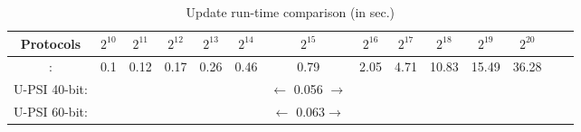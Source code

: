 \begin{table*}[!htbp]
\begin{footnotesize}
\begin{center}
\caption{\small Update run-time comparison (in sec.)}\label{tbl::update} 


\renewcommand{\arraystretch}{1.3}

\begin{tabular}{|c|ccccccccccc|c|c} 
\hline 
\cellcolor{gray!20} \scriptsize \textbf{Protocols} &\cellcolor{gray!20} $2^{\scriptscriptstyle 10}$ &\cellcolor{gray!20}  $2^{\scriptscriptstyle 11}$&  \cellcolor{gray!20}$2^{\scriptscriptstyle 12}$&\cellcolor{gray!20}  $2^{\scriptscriptstyle 13}$&\cellcolor{gray!20} $2^{\scriptscriptstyle 14}$&\cellcolor{gray!20}   $2^{\scriptscriptstyle 15}$&\cellcolor{gray!20}  $2^{\scriptscriptstyle 16}$&\cellcolor{gray!20}   $2^{\scriptscriptstyle 17}$& \cellcolor{gray!20}  $2^{\scriptscriptstyle 18}$& \cellcolor{gray!20} $2^{\scriptscriptstyle 19}$&\cellcolor{gray!20}  $2^{\scriptscriptstyle 20}$ \\
    \hline
    
    \hline



\cellcolor{cyan!20}  \scriptsize \cite{eopsi}:&\cellcolor{cyan!20} 0.1&\cellcolor{cyan!20} 0.12&\cellcolor{cyan!20}  0.17&\cellcolor{cyan!20} 0.26&\cellcolor{cyan!20}  0.46&\cellcolor{cyan!20}  0.79 &\cellcolor{cyan!20}  2.05&\cellcolor{cyan!20}  4.71  &\cellcolor{cyan!20} 10.83 &\cellcolor{cyan!20} 15.49 & \cellcolor{cyan!20} 36.28    \\

\cellcolor{white!20}  \scriptsize U-PSI 40-bit: &\cellcolor{white!20}   &\cellcolor{white!20}   &\cellcolor{white!20} &\cellcolor{white!20}   &\cellcolor{white!20} &\cellcolor{white!20}$\leftarrow$ 0.056 $\rightarrow$ &\cellcolor{white!20} &\cellcolor{white!20} &\cellcolor{white!20}   &\cellcolor{white!20}  &\cellcolor{white!20}  \\ 

   \cellcolor{cyan!20}\scriptsize U-PSI 60-bit:      &\cellcolor{cyan!20} &\cellcolor{cyan!20} &\cellcolor{cyan!20}  &\cellcolor{cyan!20}  &\cellcolor{cyan!20} &\cellcolor{cyan!20} $\leftarrow$ 0.063$\rightarrow$ &\cellcolor{cyan!20} &\cellcolor{cyan!20}&\cellcolor{cyan!20} &\cellcolor{cyan!20} &\cellcolor{cyan!20}  \\ 
       \hline





\end{tabular}
\end{center}
\end{footnotesize}
\end{table*}







